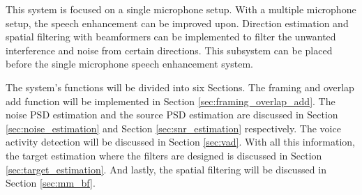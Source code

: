 This system is focused on a single microphone setup. With a multiple microphone setup, the speech enhancement can be improved upon. Direction estimation and spatial filtering with beamformers can be implemented to filter the unwanted interference and noise from certain directions. This subsystem can be placed before the single microphone speech enhancement system.

The system's functions will be divided into six Sections. The framing and overlap add function will be implemented in Section \ref{sec:framing_overlap_add}. The noise PSD estimation and the source PSD estimation are discussed in Section \ref{sec:noise_estimation} and Section \ref{sec:snr_estimation} respectively. The voice activity detection will be discussed in Section \ref{sec:vad}. With all this information, the target estimation where the filters are designed is discussed in Section \ref{sec:target_estimation}. And lastly, the spatial filtering will be discussed in Section \ref{sec:mm_bf}.
